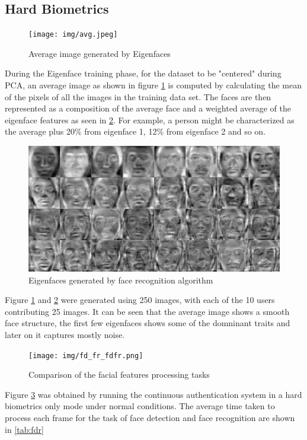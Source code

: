 \documentclass[12pt]{article}			%
\begin{document}
\subsection{Hard Biometrics}
\begin{figure}[h!]
	\centering
	\texttt{[image: img/avg.jpeg]}
	\caption{Average image generated by Eigenfaces}
	\label{fig:avg}
\end{figure}
During the Eigenface training phase, for the dataset to be "centered" during PCA, an average image as shown in figure \ref{fig:avg} is computed by calculating the mean of the pixels of all the images in the training data set. 
The faces are then represented as a composition of the average face and a weighted average of the eigenface features as seen in \ref{fig:eigen}.
For example, a person might be characterized as the average plus 20\% from eigenface 1, 12\% from eigenface 2 and so on.
\begin{figure}[h!]
	\centering
	\includegraphics[scale=0.15]{img/eigen.png}
	\caption{Eigenfaces generated by face recognition algorithm}
	\label{fig:eigen}
\end{figure}
Figure \ref{fig:avg} and \ref{fig:eigen} were generated using 250 images, with each of the 10 users contributing 25 images.
It can be seen that the average image shows a smooth face structure, the first few eigenfaces shows some of the domninant traits and later on it captures mostly noise.

\begin{figure}[h!]
	\centering
	\texttt{[image: img/fd\_fr\_fdfr.png]}
	\caption{Comparison of the facial features processing tasks}
	\label{fig:fdfr}
\end{figure}
Figure \ref{fig:fdfr} was obtained by running the continuous authentication system in a hard biometrics only mode under normal conditions. The average time taken to process each frame for the task of face detection and face recognition are shown in \ref{tab:fdr}
\end{document}

